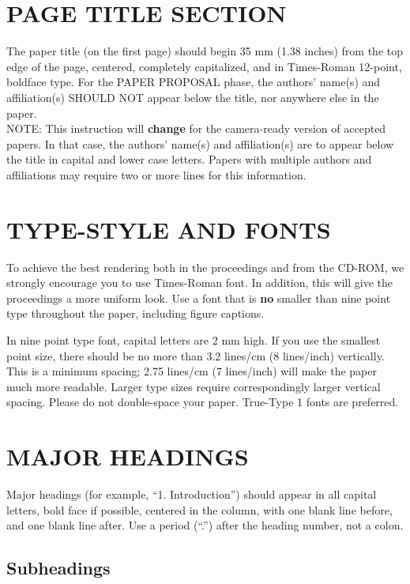 \documentclass[a4paper]{article}
\begin{document}
\section{PAGE TITLE SECTION}
\label{sec:pagestyle}

The paper title (on the first page) should begin 35 mm (1.38 inches)
from the top edge of the page, centered, completely capitalized, and
in Times-Roman 12-point, boldface type.  For the PAPER PROPOSAL phase,
the authors' name(s) and affiliation(s) SHOULD NOT appear below the
title, nor anywhere else in the paper.\\
{\small NOTE: This instruction will {\bf change} for the camera-ready
version of accepted papers. In that case, the authors' name(s) and
affiliation(s) are to appear below the title in capital and lower case
letters.  Papers with multiple authors and affiliations may require
two or more lines for this information.}

\section{TYPE-STYLE AND FONTS}
\label{sec:typestyle}

To achieve the best rendering both in the proceedings and from the
CD-ROM, we strongly encourage you to use Times-Roman font.  In
addition, this will give the proceedings a more uniform look.  Use a
font that is {\bf no} smaller than nine point type throughout the
paper, including figure captions.

In nine point type font, capital letters are 2 mm high.  If you use the
smallest point size, there should be no more than 3.2 lines/cm (8 lines/inch)
vertically.  This is a minimum spacing; 2.75 lines/cm (7 lines/inch) will make
the paper much more readable.  Larger type sizes require correspondingly larger
vertical spacing.  Please do not double-space your paper.  True-Type 1 fonts
are preferred.

\section{MAJOR HEADINGS}
\label{sec:majhead}

Major headings (for example, ``1. Introduction'') should appear in all
capital letters, bold face if possible, centered in the column, with
one blank line before, and one blank line after. Use a period (``.'')
after the heading number, not a colon.

\subsection{Subheadings}
\label{ssec:subhead}
\end{document}
